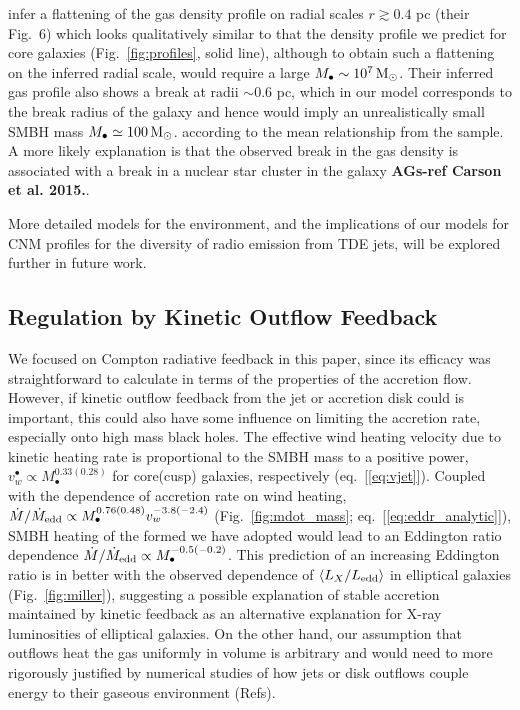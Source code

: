 \documentclass[usenatbib,fleqn]{mn2e}
\newcommand{\Mbh}[1][]{M_{\bullet#1}}
\begin{document}
\citet{BergerZauderer+:2012a} infer a flattening of the gas density
profile on radial scales $r \gtrsim 0.4$ pc (their Fig.~6) which looks
qualitatively similar to that the density profile we predict for core
galaxies (Fig.~\ref{fig:profiles}, solid line), although to obtain
such a flattening on the inferred radial scale, would require a large
$\Mbh\sim 10^7 \Msun$.  Their inferred gas profile also shows a break
at radii $\sim 0.6$ pc, which in our model corresponds to the break
radius of the galaxy and hence would imply an unrealistically small
SMBH mass $\Mbh\simeq 100\Msun$.  according to the mean relationship
from the \citet{Lauer+Faber:2007a} sample. A more likely explanation
is that the observed break in the gas density is associated with a
break in a nuclear star cluster in the galaxy {\bf AGs-ref Carson et
  al. 2015.}. 

More detailed models for the environment, and the implications of our
models for CNM profiles for the diversity of radio emission from TDE
jets, will be explored further in future work.

\subsection{Regulation by Kinetic Outflow Feedback}
\label{sec:kinetic}

We focused on Compton radiative feedback in this paper, since its
efficacy was straightforward to calculate in terms of the properties
of the accretion flow.  However, if kinetic outflow feedback from the
jet or accretion disk could is important, this could also have some
influence on limiting the accretion rate, especially onto high mass
black holes.  The effective wind heating velocity due to kinetic
heating rate is proportional to the SMBH mass to a positive power,
$v_{w}^{\bullet} \propto M_{\bullet}^{0.33(0.28)}$ for core(cusp)
galaxies, respectively (eq.~[\ref{eq:vjet}]).  Coupled with the
dependence of accretion rate on wind heating, $\dot{M}/\dot{M}_{\rm
  edd} \propto M_{\bullet}^{0.76(0.48)}v_{w}^{-3.8(-2.4)}$
(Fig.~\ref{fig:mdot_mass}; eq.~[\ref{eq:eddr_analytic}]), SMBH heating
of the formed we have adopted would lead to an Eddington ratio
dependence $\dot{M}/\dot{M}_{\rm edd} \propto
M_{\bullet}^{-0.5(-0.2)}$.  This prediction of an increasing Eddington
ratio is in better with the observed dependence of $\langle
L_{X}/L_{\rm edd} \rangle$ in elliptical galaxies
(Fig.~\ref{fig:miller}), suggesting a possible explanation of stable
accretion maintained by kinetic feedback as an alternative explanation
for X-ray luminosities of elliptical galaxies.  On the other hand, our
assumption that outflows heat the gas uniformly in volume is arbitrary
and would need to more rigorously justified by numerical studies of
how jets or disk outflows couple energy to their gaseous environment
(Refs).
\end{document}
